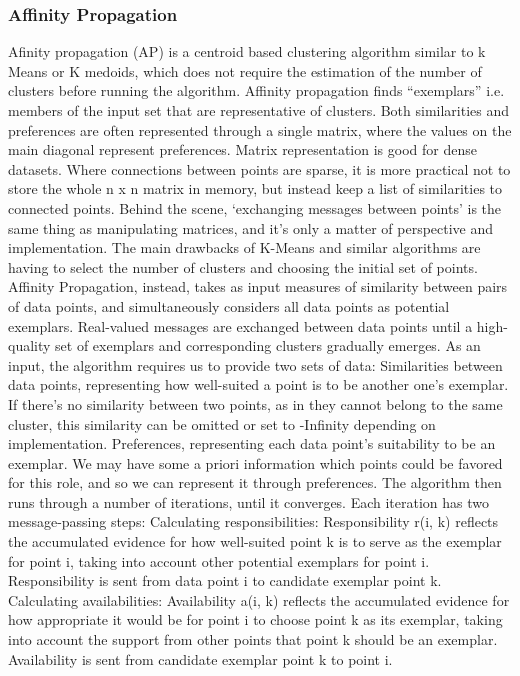 \documentclass[a4paper, 12pt]{article}
\begin{document}
\subsubsection{Affinity Propagation}
Afinity propagation (AP) is a centroid based clustering algorithm similar to k Means or K medoids, which does not require the estimation of the number of clusters before running the algorithm. Affinity propagation finds “exemplars” i.e. members of the input set that are representative of clusters.
Both similarities and preferences are often represented through a single matrix, where the values on the main diagonal represent preferences. Matrix representation is good for dense datasets. Where connections between points are sparse, it is more practical not to store the whole n x n matrix in memory, but instead keep a list of similarities to connected points. Behind the scene, ‘exchanging messages between points’ is the same thing as manipulating matrices, and it’s only a matter of perspective and implementation.
The main drawbacks of K-Means and similar algorithms are having to select the number of clusters and choosing the initial set of points. Affinity Propagation, instead, takes as input measures of similarity between pairs of data points, and simultaneously considers all data points as potential exemplars. Real-valued messages are exchanged between data points until a high-quality set of exemplars and corresponding clusters gradually emerges.
As an input, the algorithm requires us to provide two sets of data:
    Similarities between data points, representing how well-suited a point is to be another one’s exemplar. If there’s no similarity between two points, as in they cannot belong to the same cluster, this similarity can be omitted or set to -Infinity depending on implementation.
    Preferences, representing each data point’s suitability to be an exemplar. We may have some a priori information which points could be favored for this role, and so we can represent it through preferences.
The algorithm then runs through a number of iterations, until it converges. Each iteration has two message-passing steps:
    Calculating responsibilities: Responsibility r(i, k) reflects the accumulated evidence for how well-suited point k is to serve as the exemplar for point i, taking into account other potential exemplars for point i. Responsibility is sent from data point i to candidate exemplar point k.
    Calculating availabilities: Availability a(i, k) reflects the accumulated evidence for how appropriate it would be for point i to choose point k as its exemplar, taking into account the support from other points that point k should be an exemplar. Availability is sent from candidate exemplar point k to point i.
\end{document}
